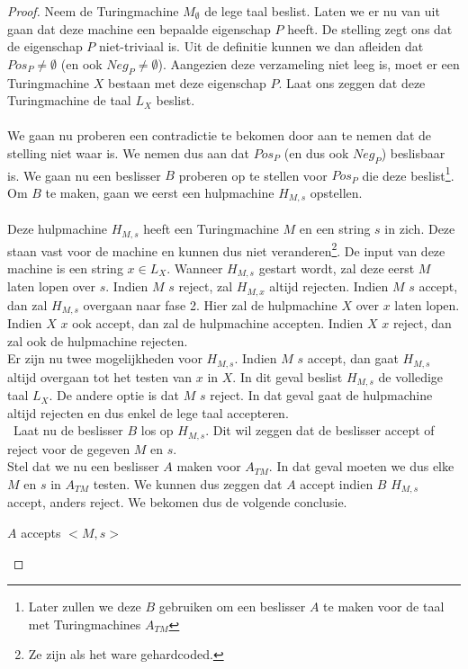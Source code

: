 \begin{proof}
	Neem de Turingmachine $M_\emptyset$ de lege taal beslist. Laten we er nu van uit gaan dat deze machine een bepaalde eigenschap $P$ heeft. De stelling zegt ons dat de eigenschap $P$ niet-triviaal is. Uit de definitie kunnen we dan afleiden dat $Pos_P \neq \emptyset$ (en ook $Neg_P \neq \emptyset$). Aangezien deze verzameling niet leeg is, moet er een Turingmachine $X$ bestaan met deze eigenschap $P$. Laat ons zeggen dat deze Turingmachine de taal $L_X$ beslist.\\\\
	We gaan nu proberen een contradictie te bekomen door aan te nemen dat de stelling niet waar is. We nemen dus aan dat $Pos_P$ (en dus ook $Neg_P$) beslisbaar is. We gaan nu een beslisser $B$ proberen op te stellen voor $Pos_P$ die deze beslist\footnote{Later zullen we deze $B$ gebruiken om een beslisser $A$ te maken voor de taal met Turingmachines $A_{TM}$}. Om $B$ te maken, gaan we eerst een hulpmachine $H_{M,s}$ opstellen.\\\\
	Deze hulpmachine $H_{M,s}$ heeft een Turingmachine $M$ en een string $s$ in zich. Deze staan vast voor de machine en kunnen dus niet veranderen\footnote{Ze zijn als het ware gehardcoded.}. De input van deze machine is een string $x \in L_X$. Wanneer $H_{M,s}$ gestart wordt, zal deze eerst $M$ laten lopen over $s$. Indien $M$ $s$ reject, zal $H_{M,x}$ altijd rejecten. Indien $M$ $s$ accept, dan zal $H_{M,s}$ overgaan naar fase 2. Hier zal de hulpmachine $X$ over $x$ laten lopen. Indien $X$ $x$ ook accept, dan zal de hulpmachine accepten. Indien $X$ $x$ reject, dan zal ook de hulpmachine rejecten.\\
	Er zijn nu twee mogelijkheden voor $H_{M,s}$. Indien $M$ $s$ accept, dan gaat $H_{M,s}$ altijd overgaan tot het testen van $x$ in $X$. In dit geval beslist $H_{M,s}$ de volledige taal $L_X$. De andere optie is dat $M$ $s$ reject. In dat geval gaat de hulpmachine altijd rejecten en dus enkel de lege taal accepteren.\\\
	Laat nu de beslisser $B$ los op $H_{M,s}$. Dit wil zeggen dat de beslisser accept of reject voor de gegeven $M$ en $s$.\\
	Stel dat we nu een beslisser $A$ maken voor $A_{TM}$. In dat geval moeten we dus elke $M$ en $s$ in $A_{TM}$ testen. We kunnen dus zeggen dat $A$ accept indien $B$ $H_{M,s}$ accept, anders reject. We bekomen dus de volgende conclusie.
	\begin{center}
		$A$ accepts $<M,s>$\\

\end{center}
\end{proof}
